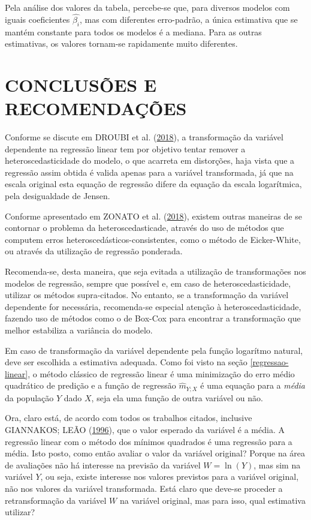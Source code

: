 \documentclass[a4paper, 12pt]{article}
\begin{document}
Pela análise dos valores da tabela, percebe-se que, para diversos
modelos com iguais coeficientes \(\hat{\beta_i}\), mas com diferentes
erro-padrão, a única estimativa que se mantém constante para todos os
modelos é a mediana. Para as outras estimativas, os valores tornam-se
rapidamente muito diferentes.

\section{CONCLUSÕES E RECOMENDAÇÕES}\label{conclusoes-e-recomendacoes}

Conforme se discute em DROUBI et al.
(\protect\hyperlink{ref-dist_lognormal}{2018}), a transformação da
variável dependente na regressão linear tem por objetivo tentar remover
a heteroscedasticidade do modelo, o que acarreta em distorções, haja
vista que a regressão assim obtida é valida apenas para a variável
transformada, já que na escala original esta equação de regressão difere
da equação da escala logarítmica, pela desigualdade de Jensen.

Conforme apresentado em ZONATO et al.
(\protect\hyperlink{ref-pressupostos_classicos}{2018}), existem outras
maneiras de se contornar o problema da heteroscedasticade, através do
uso de métodos que computem erros heteroscedásticos-consistentes, como o
método de Eicker-White, ou através da utilização de regressão ponderada.

Recomenda-se, desta maneira, que seja evitada a utilização de
transformações nos modelos de regressão, sempre que possível e, em caso
de heteroscedasticidade, utilizar os métodos supra-citados. No entanto,
se a transformação da variável dependente for necessária, recomenda-se
especial atenção à heteroscedasticidade, fazendo uso de métodos como o
de Box-Cox para encontrar a transformação que melhor estabiliza a
variância do modelo.

Em caso de transformação da variável dependente pela função logarítmo
natural, deve ser escolhida a estimativa adequada. Como foi visto na
seção \ref{regressao-linear}, o método clássico de regressão linear é
uma minimização do erro médio quadrático de predição e a função de
regressão \(\hat{m}_{Y;X}\) é uma equação para a \emph{média} da
população \(Y\) dado \(X\), seja ela uma função de outra variável ou
não.

Ora, claro está, de acordo com todos os trabalhos citados, inclusive
GIANNAKOS; LEÃO (\protect\hyperlink{ref-giannakos}{1996}), que o valor
esperado da variável é a média. A regressão linear com o método dos
mínimos quadrados é uma regressão para a média. Isto posto, como então
avaliar o valor da variável original? Porque na área de avaliações não
há interesse na previsão da variável \(W = \ln(Y)\), mas sim na variável
\(Y\), ou seja, existe interesse nos valores previstos para a variável
original, não nos valores da variável transformada. Está claro que
deve-se proceder a retransformação da variável \(W\) na variável
original, mas para isso, qual estimativa utilizar?
\end{document}
